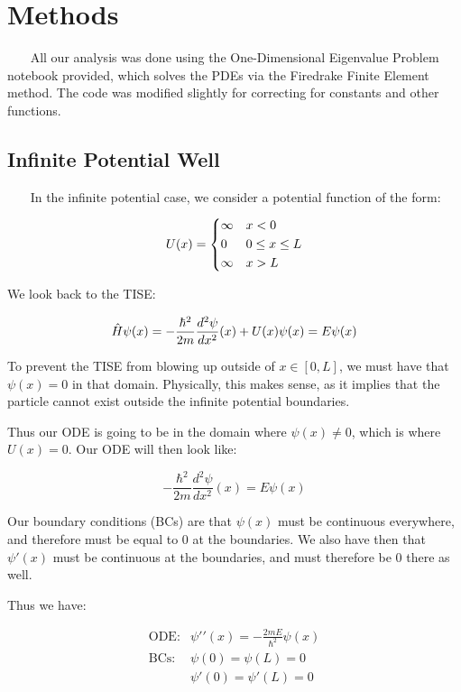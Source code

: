 \documentclass[12pt]{article}
\begin{document}
\section{Methods}
~~~ All our analysis was done using the One-Dimensional Eigenvalue Problem notebook provided, which solves the PDEs via the Firedrake Finite Element method. The code was modified slightly for correcting for constants and other functions. 


\subsection{Infinite Potential Well}
~~~ In the infinite potential case, we consider a potential function of the form:

\begin{equation}
    U(x) = 
    \begin{dcases}
        \infty & x < 0 \\
        0 & 0\leq x\leq L \\
        \infty & x > L \\
    \end{dcases}
\end{equation}

We look back to the TISE: 

\begin{equation}\notag
    \hat{H}\psi(x) = -\frac{\hbar^2}{2m}\frac{d^2\psi}{dx^2}(x) + U(x)\psi(x) = E\psi(x)
\end{equation}

To prevent the TISE from blowing up outside of $x\in[0,L]$, we must have that $\psi(x) = 0$ in that domain. Physically, this makes sense, as it implies that the particle cannot exist outside the infinite potential boundaries. 

Thus our ODE is going to be in the domain where $\psi(x)\neq0$, which is where $U(x)=0$. Our ODE will then look like:

\begin{equation}
    -\frac{\hbar^2}{2m}\frac{d^2\psi}{dx^2}(x) = E\psi(x)
\end{equation}

Our boundary conditions (BCs) are that $\psi(x)$ must be continuous everywhere, and therefore must be equal to $0$ at the boundaries. We also have then that $\psi\prime(x)$ must be continuous at the boundaries, and must therefore be 0 there as well.

Thus we have:

\[\begin{array}{cc}
    \mbox{ODE:} & \psi\prime\prime(x) = -\frac{2mE}{\hbar^2}\psi(x)  \\
    \mbox{BCs:} & \psi(0) = \psi(L) = 0 \\
    \mbox{} & \psi\prime(0) = \psi\prime(L) = 0
\end{array}\]
\end{document}
